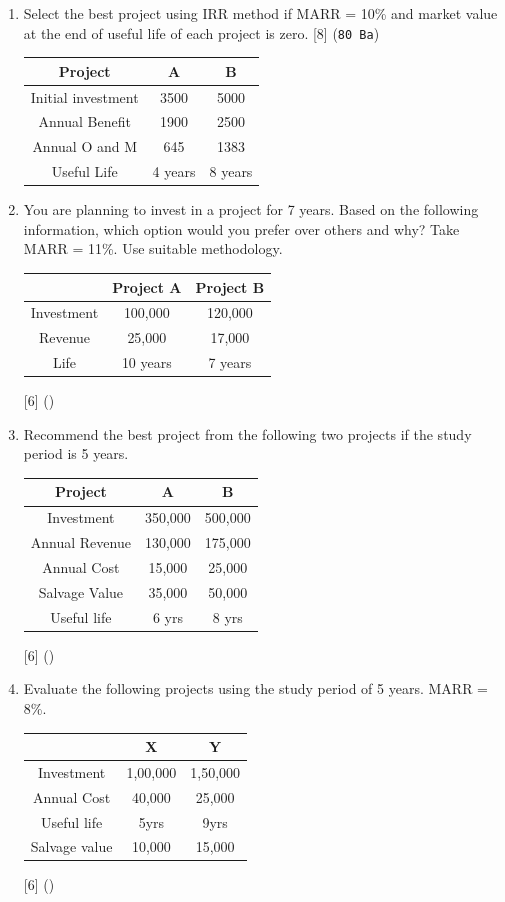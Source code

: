 \documentclass[12pt]{article}
\begin{document}
\begin{enumerate}
			\item Select the best project using IRR method if MARR = 10\% and market value at the end of useful life of each project is zero. \hfill [8] (\texttt{80 Ba})\\
				\begin{tabular}{|c|c|c|}
					\hline
					Project & A & B \\ \hline
					Initial investment & 3500 & 5000 \\ \hline
					Annual Benefit & 1900 & 2500 \\ \hline
					Annual O and M & 645 & 1383 \\ \hline
					Useful Life & 4 years & 8 years \\ \hline
				\end{tabular}

			\item You are planning to invest in a project for 7 years. Based on the following information, which option would you prefer over others and why? Take MARR = 11\%. Use suitable methodology. 
				\begin{tabular}{|c|c|c|}
					\hline
					& Project A & Project B \\ \hline
					Investment & 100,000 & 120,000 \\ \hline
					Revenue & 25,000 & 17,000 \\ \hline
					Life & 10 years & 7 years \\ \hline
				\end{tabular} \hfill [6] ()

			\item Recommend the best project from the following two projects if the study period is 5 years.
			\begin{tabular}{|c|c|c|}
				\hline
				Project & A & B \\ \hline
				Investment & 350,000 & 500,000 \\ \hline
				Annual Revenue & 130,000 & 175,000 \\ \hline
				Annual Cost & 15,000 & 25,000 \\ \hline
				Salvage Value & 35,000 & 50,000 \\ \hline
				Useful life & 6 yrs & 8 yrs \\ \hline
			\end{tabular} \hfill [6] ()

			\item Evaluate the following projects using the study period of 5 years. MARR = 8\%.\\
				\begin{tabular}{|c|c|c|}
					\hline
					& X & Y \\ \hline
					Investment & 1,00,000 & 1,50,000 \\ \hline
					Annual Cost & 40,000 & 25,000 \\ \hline
					Useful life & 5yrs & 9yrs \\ \hline
					Salvage value & 10,000 & 15,000 \\ \hline
				\end{tabular} \hfill [6] ()
		\end{enumerate}
	
\end{document}
